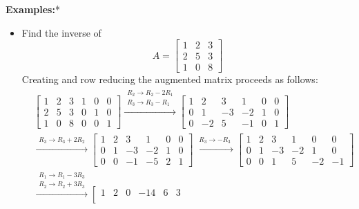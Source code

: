 \documentclass{article}
\begin{document}
\textbf{Examples:}*
\begin{itemize}
\item Find the inverse of 
\[A = \begin{bmatrix} 
1 & 2 & 3 \\   
2 & 5 & 3 \\ 
1 & 0 & 8 
\end{bmatrix}\]
Creating and row reducing the augmented matrix proceeds as follows:
\begin{align*}
& \left[\begin{array}{ccc|ccc}
1 & 2 & 3 & 1 & 0 & 0 \\   
2 & 5 & 3 & 0 & 1 & 0 \\ 
1 & 0 & 8 & 0 & 0 & 1  
\end{array}\right]
\xrightarrow{\begin{array}{c} R_2 \rightarrow R_2 - 2R_1 \\ R_3 \rightarrow R_3 - R_1 \end{array}}
\left[\begin{array}{ccc|ccc}
1 & 2 & 3 & 1 & 0 & 0 \\   
0 & 1 & -3 & -2 & 1 & 0 \\ 
0 & -2 & 5 & -1 & 0 & 1  
\end{array}\right] \\
& \xrightarrow{\begin{array}{c} R_3 \rightarrow R_3 + 2R_2 \end{array}}
\left[\begin{array}{ccc|ccc}
1 & 2 & 3 & 1 & 0 & 0 \\   
0 & 1 & -3 & -2 & 1 & 0 \\ 
0 & 0 & -1 & -5 & 2 & 1  
\end{array}\right] 
\xrightarrow{\begin{array}{c} R_3 \rightarrow -R_3 \end{array}}
\left[\begin{array}{ccc|ccc}
1 & 2 & 3 & 1 & 0 & 0 \\   
0 & 1 & -3 & -2 & 1 & 0 \\ 
0 & 0 & 1 & 5 & -2 & -1  
\end{array}\right] \\ 
& \xrightarrow{\begin{array}{c} R_1 \rightarrow R_1 - 3R_3 \\ R_2 \rightarrow R_2 + 3R_3 \end{array}} 
\left[\begin{array}{ccc|ccc}
1 & 2 & 0 & -14 & 6 & 3 \\   

\end{array}
\end{align*}
\end{itemize}
\end{document}
